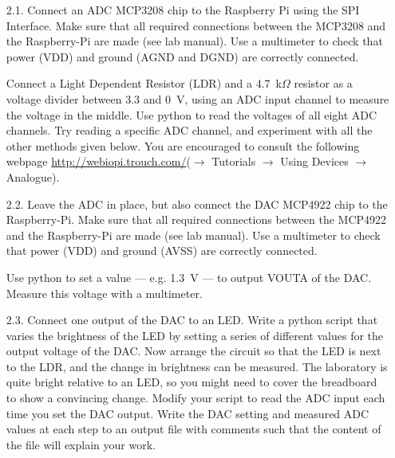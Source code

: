 \vspace*{-0.5cm}
\begin{enumerate}

\item [2.1.] Connect an ADC MCP3208 chip to the Raspberry Pi using the SPI Interface.
Make sure that all required connections between the MCP3208 and the Raspberry-Pi are made (see lab manual).
Use a multimeter to check that power (VDD) and ground (AGND and DGND) are correctly connected.

Connect a Light Dependent Resistor (LDR) and a 4.7~k$\Omega$ resistor as a voltage divider between 3.3 and 0~V, using an ADC input channel to measure the voltage in the middle.
Use python to read the voltages of all eight ADC channels.
Try reading a specific ADC channel, and experiment with all the other methods given below.
You are encouraged to consult the following webpage \url{http://webiopi.trouch.com/}($\rightarrow$ Tutorials $\rightarrow$ Using Devices $\rightarrow$ Analogue).


\vspace*{-0.5cm}

\newpage
\item [2.2.] Leave the ADC in place, but also connect the DAC MCP4922 chip to the Raspberry-Pi.
Make sure that all required connections between the MCP4922 and the Raspberry-Pi are made (see lab manual).
Use a multimeter to check that power (VDD) and ground (AVSS) are correctly connected.

Use python to set a value --- e.g. 1.3~V --- to output VOUTA of the DAC.
Measure this voltage with a multimeter. \\



\item [2.3.] Connect one output of the DAC to an LED.
Write a python script that varies the brightness of the LED by setting a series of different values for the output voltage of the DAC.
Now arrange the circuit so that the LED is next to the LDR, and the change in brightness can be measured.
The laboratory is quite bright relative to an LED, so you might need to cover the breadboard to show a convincing change.
Modify your script to read the ADC input each time you set the DAC output.
Write the DAC setting and measured ADC values at each step to an output file with comments such that the content of the file will explain your work.

\end{enumerate}


